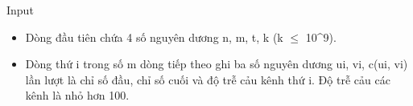 Input
\begin{itemize}
	\item Dòng đầu tiên chứa 4 số nguyên dương n, m, t, k (k  $\le$  10^9).
	\item Dòng thứ i trong số m dòng tiếp theo ghi ba số nguyên dương ui, vi, c(ui, vi) lần lượt là chỉ số đầu, chỉ số cuối và độ trễ cảu kênh thứ i. Độ trễ cảu các kênh là nhỏ hơn 100.
\end{itemize}